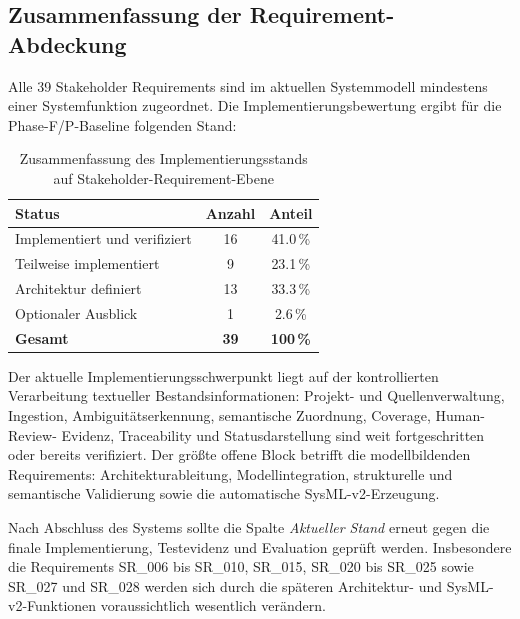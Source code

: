 \subsection{Zusammenfassung der Requirement-Abdeckung}

Alle 39 Stakeholder Requirements sind im aktuellen Systemmodell mindestens
einer Systemfunktion zugeordnet. Die Implementierungsbewertung ergibt für die
Phase-F/P-Baseline folgenden Stand:

\begin{table}[htbp]
\centering
\caption{Zusammenfassung des Implementierungsstands auf Stakeholder-Requirement-Ebene}
\label{tab:sr_status_summary}
\begin{tabular}{lcc}
\toprule
\textbf{Status} & \textbf{Anzahl} & \textbf{Anteil} \\
\midrule
Implementiert und verifiziert & 16 & 41.0\,\% \\
Teilweise implementiert & 9 & 23.1\,\% \\
Architektur definiert & 13 & 33.3\,\% \\
Optionaler Ausblick & 1 & 2.6\,\% \\
\midrule
\textbf{Gesamt} & \textbf{39} & \textbf{100\,\%} \\
\bottomrule
\end{tabular}
\end{table}

Der aktuelle Implementierungsschwerpunkt liegt auf der kontrollierten
Verarbeitung textueller Bestandsinformationen: Projekt- und Quellenverwaltung,
Ingestion, Ambiguitätserkennung, semantische Zuordnung, Coverage, Human-Review-
Evidenz, Traceability und Statusdarstellung sind weit fortgeschritten oder
bereits verifiziert. Der größte offene Block betrifft die modellbildenden
Requirements: Architekturableitung, Modellintegration, strukturelle und
semantische Validierung sowie die automatische SysML-v2-Erzeugung.

\begin{tcolorbox}[
  enhanced,
  breakable,
  colback=gray!4,
  colframe=TuringSlate,
  title={Hinweis für die finale Fassung der Masterarbeit},
  fonttitle=\bfseries,
  arc=2mm
]
Nach Abschluss des Systems sollte die Spalte \emph{Aktueller Stand} erneut
gegen die finale Implementierung, Testevidenz und Evaluation geprüft werden.
Insbesondere die Requirements SR\_006 bis SR\_010, SR\_015, SR\_020 bis
SR\_025 sowie SR\_027 und SR\_028 werden sich durch die späteren
Architektur- und SysML-v2-Funktionen voraussichtlich wesentlich verändern.
\end{tcolorbox}
